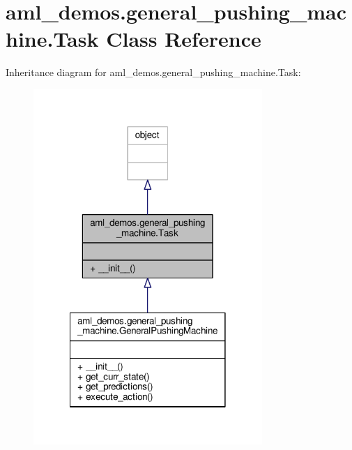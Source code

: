 \hypertarget{classaml__demos_1_1general__pushing__machine_1_1_task}{\section{aml\-\_\-demos.\-general\-\_\-pushing\-\_\-machine.\-Task Class Reference}
\label{classaml__demos_1_1general__pushing__machine_1_1_task}
}


Inheritance diagram for aml\-\_\-demos.\-general\-\_\-pushing\-\_\-machine.\-Task\-:\nopagebreak
\begin{figure}[H]
\begin{center}
\leavevmode
\includegraphics[width=246pt]{classaml__demos_1_1general__pushing__machine_1_1_task__inherit__graph}
\end{center}
\end{figure}


